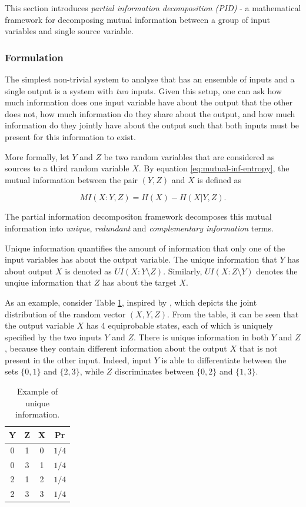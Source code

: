 \documentclass[12pt]{article}
\begin{document}
This section introduces \textit{partial information decomposition (PID)} - a mathematical framework for decomposing mutual information between a group of input variables and single source variable.   

\subsubsection{Formulation}

The simplest non-trivial system to analyse that has an ensemble of inputs and a single output is a system with \textit{two} inputs. Given this setup, one can ask how much information does one input variable have about the output that the other does not, how much information do they share about the output, and how much information do they jointly have about the output such that both inputs must be present for this information to exist.

More formally, let $Y$ and $Z$ be two random variables that are considered as sources to a third random variable $X$. By equation \ref{eq:mutual-inf-entropy}, the mutual information between the pair $(Y,Z)$ and $X$ is defined as 

$$MI(X:Y,Z) = H(X) - H(X|Y,Z).$$

The partial information decompositon framework decomposes this mutual information into \textit{unique}, \textit{redundant} and \textit{complementary information} terms. 

Unique information quantifies the amount of information that only one of the input variables has about the output variable. The unique information that $Y$ has about output $X$ is denoted as $UI(X:Y \setminus Z)$. Similarly, $UI(X:Z \setminus Y)$ denotes the unqiue information that $Z$ has about the target $X$.

As an example, consider Table \ref{table:1}, inspired by \cite{pid-synergy}, which depicts the joint distribution of the random vector $(X,Y,Z)$. From the table, it can be seen that the output variable $X$ has 4 equiprobable states, each of which is uniquely specified by the two inputs $Y$ and $Z$. There is unique information in both $Y$ and $Z$, because they contain different information about the output $X$ that is not present in the other input. Indeed, input $Y$ is able to differentiate between the sets $\{0,1\}$ and $\{2,3\}$, while $Z$ discriminates between $\{0, 2\}$ and $\{1,3\}$.

\begin{table}[h!]
\centering
\begin{tabular}{|c c |c|c|}
	\hline
	Y & Z & X & Pr\\ 
	\hline
	0 & 1 & 0 & $1/4$ \\
	0 & 3 & 1 & $1/4$ \\
	2 & 1 & 2 & $1/4$ \\
	2 & 3 & 3 & $1/4$ \\
	\hline
\end{tabular}
\caption{Example of unique information.}
\label{table:1}
\end{table}
\end{document}
